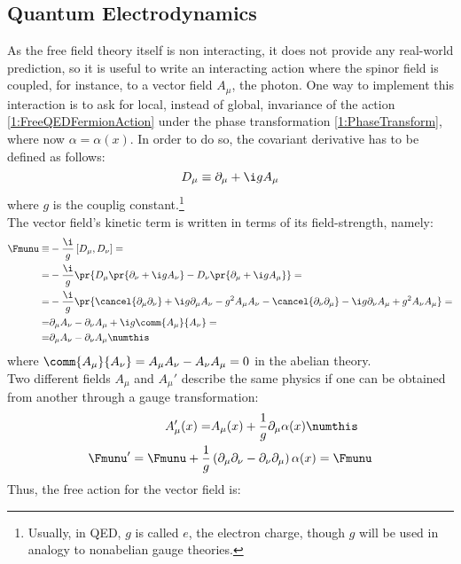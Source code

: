 \subsection{Quantum Electrodynamics\label{Sec1:QED}}
As the free field theory itself is non interacting, it does not provide any real-world prediction, so it is useful to write an interacting action where the spinor field is coupled, for instance, to a vector field $A_\mu$, \ie the photon.
One way to implement this interaction is to ask for local, instead of global, invariance of the action \eqref{1:FreeQEDFermionAction} under the phase transformation \eqref{1:PhaseTransform}, where now $\alpha=\alpha(x)$.
In order to do so, the covariant derivative has to be defined as follows:
\begin{equation}
    D_\mu \equiv \partial_\mu+\i g A_\mu \label{1:QEDCovDeriv}
\end{equation}
where $g$ is the couplig constant.\footnote{Usually, in QED, $g$ is called $e$, the electron charge, though $g$ will be used in analogy to nonabelian gauge theories.}\\
The vector field's kinetic term is written in terms of its field-strength, namely:
\begin{align*}
    \Fmunu\equiv& -\frac{\i}{g}\left[D_\mu,D_\nu\right] = \\
    =& -\frac{\i}{g}\pr{D_\mu\pr{\partial_\nu+\i g A_\nu} - D_\nu\pr{\partial_\mu+\i g A_\mu}}=\\
    =& -\frac{\i}{g}\pr{\cancel{\partial_\mu\partial_\nu} + \i g\partial_\mu A_\nu -g^2A_\mu A_\nu - \cancel{\partial_\nu\partial_\mu} - \i g\partial_\nu A_\mu + g^2A_\nu A_\mu}=\\
    =& \partial_\mu A_\nu - \partial_\nu A_\mu + \i g\comm{A_\mu}{A_\nu}=\\
    =& \partial_\mu A_\nu - \partial_\nu A_\mu \numthis\label{1:FieldStrU1}
\end{align*}
where $\comm{A_\mu}{A_\nu}=A_\mu A_\nu-A_\nu A_\mu=0$ in the abelian theory.\\
Two different fields $A_\mu$ and $A_\mu'$ describe the same physics if one can be obtained from another through a gauge transformation:
\begin{align*}
    A_\mu'(x) =& A_\mu(x) + \frac1g \partial_\mu\alpha(x) \numthis\label{1:QEDGaugeTransf} \\
    \Fmunu' = \Fmunu + \frac1g&\left( \partial_\mu\partial_\nu-\partial_\nu\partial_\mu \right)\alpha(x) = \Fmunu
\end{align*}
Thus, the free action for the vector field is:
